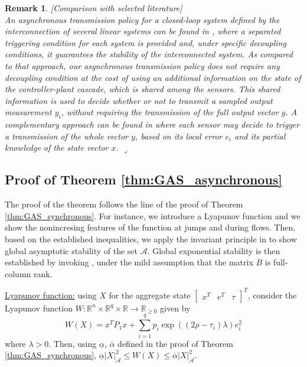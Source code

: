 \documentclass[twocolumn]{autart}
\newtheorem{remm}{Remark}
\newenvironment{remark}{\begin{remm}\rm }{\hfill \hspace*{1pt} \hfill $\lrcorner$\end{remm}}
\newcommand{\realn}{\real^n}
\newcommand\real{\ensuremath{{\mathbb R}}}
\newcommand{\smallmat}[1]{\left[ \begin{smallmatrix}#1
    \end{smallmatrix} \right]}
\begin{document}
\begin{remark}[{\emph{Comparison with selected literature}}] \\
An asynchronous transmission policy for a closed-loop system
defined by the interconnection of several linear systems can be found in \cite{Wang08b}, 
where a separated triggering condition for each system is provided and,
under specific decoupling conditions, it guarantees the stability of the 
interconnected system. 
{ 
As compared to that approach,
 our asynchronous transmission policy does not require any decoupling condition 
at the cost of using an additional information on the state of the 
controller-plant cascade, which is 
shared among the sensors.
This shared information is used to decide whether
or not to transmit a sampled output measurement $y_i$, without requiring the
transmission of the full output vector $y$.}
 A complementary approach can be found in \cite{Tabuada10} where
each sensor may decide to trigger a transmission of the whole vector $y$, 
based on its local error $e_i$ and its partial knowledge of the state vector $x$.
\end{remark}

{
\subsection{Proof of Theorem \ref{thm:GAS_asynchronous}}
\label{sec:proof_thm2}

The proof of the theorem follows the line of the proof of Theorem \ref{thm:GAS_synchronous}.
For instance, we introduce a Lyapunov function and we show the nonincresing features
of the function
at jumps and during flows. Then, based on the established inequalities, we apply
the invariant principle in \cite[Theorem 23]{GoebelCSM09} to show global asymptotic
stability of the set $\mathcal{A}$. Global exponential stability is then established
by invoking \cite[Theorem 2]{TeelTAC13}, under the mild assumption that
the matrix $B$ is full-column rank.
}

{ \underline{Lyapunov function:}} 
using $X$ for the aggregate state $\smallmat{x^T & e^T &\tau}^T$,
consider the Lyapunov function 
$W:\realn\times\real^q\times\real \to \real_{\geq 0}$ given by
\begin{equation}
\label{eq:proofthm2_0}
 W(X) = x^TP_1x + \sum_{i=1}^q p_i\exp( (2\rho-\tau_i)\lambda ) e_i^2
\end{equation}
where $\lambda>0$. Then, using $\underline{\alpha}$, $\overline{\alpha}$
defined in the proof of Theorem \ref{thm:GAS_synchronous}, 
$\underline{\alpha}|X|_\mathcal{A}^2 \leq W(X) \leq \overline{\alpha}|X|_\mathcal{A}^2$.
\end{document}
